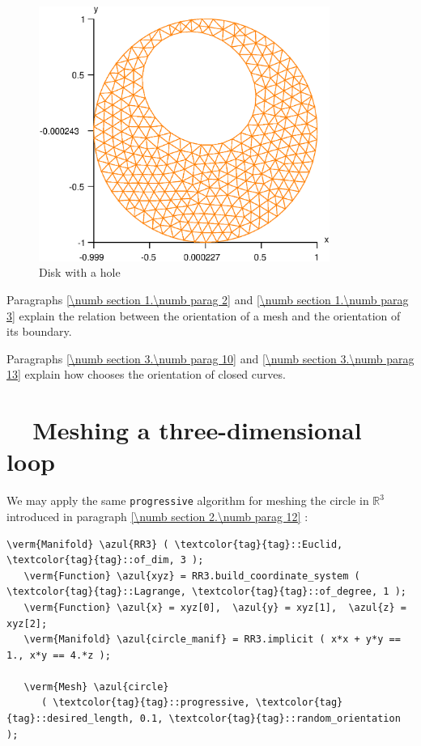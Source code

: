 \begin{figure}[ht] \centering
 \includegraphics[width=95mm]{disk-with-hole}
  \caption{Disk with a hole}
  \label{\numb section 3.\numb fig 2}
\end{figure}

Paragraphs \ref{\numb section 1.\numb parag 2} and \ref{\numb section 1.\numb parag 3} explain
the relation between the orientation of a mesh and the orientation of its boundary.

Paragraphs \ref{\numb section 3.\numb parag 10} and \ref{\numb section 3.\numb parag 13}
explain how {\maniFEM} chooses the orientation of closed curves.


\section{~~Meshing a three-dimensional loop}\label{\numb section 3.\numb parag 4}

We may apply the same {\small\tt progressive} algorithm for meshing the circle in
$ \mathbb{R}^3 $ introduced in paragraph \ref{\numb section 2.\numb parag 12} :

\begin{Verbatim}[commandchars=\\\{\},formatcom=\small\tt,frame=single,
   label=parag-\ref{\numb section 3.\numb parag 4}.cpp,rulecolor=\color{coment},
   baselinestretch=0.94,framesep=2mm                                            ]
   \verm{Manifold} \azul{RR3} ( \textcolor{tag}{tag}::Euclid, \textcolor{tag}{tag}::of_dim, 3 );
   \verm{Function} \azul{xyz} = RR3.build_coordinate_system ( \textcolor{tag}{tag}::Lagrange, \textcolor{tag}{tag}::of_degree, 1 );
   \verm{Function} \azul{x} = xyz[0],  \azul{y} = xyz[1],  \azul{z} = xyz[2];
   \verm{Manifold} \azul{circle_manif} = RR3.implicit ( x*x + y*y == 1., x*y == 4.*z );
   
   \verm{Mesh} \azul{circle}
      ( \textcolor{tag}{tag}::progressive, \textcolor{tag}{tag}::desired_length, 0.1, \textcolor{tag}{tag}::random_orientation );
\end{Verbatim}

